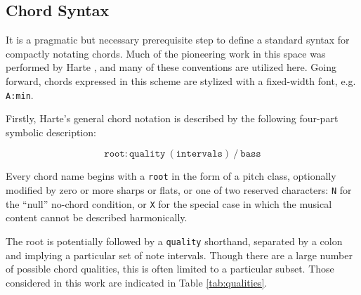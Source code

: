 \subsection{Chord Syntax}
\label{sec:chord_syntax}

It is a pragmatic but necessary prerequisite step to define a standard syntax for compactly notating chords.
Much of the pioneering work in this space was performed by Harte \cite{Harte2005Symbolic}, and many of these conventions are utilized here.
Going forward, chords expressed in this scheme are stylized with a fixed-width font, e.g. \texttt{A:min}.

Firstly, Harte's general chord notation is described by the following four-part symbolic description:

\begin{equation}
\texttt{root}:\texttt{quality}~(\texttt{intervals})~/~\texttt{bass}
\end{equation}

\noindent Every chord name begins with a \texttt{root} in the form of a pitch class, optionally modified by zero or more sharps or flats, or one of two reserved characters: \texttt{N} for the ``null'' no-chord condition, or \texttt{X} for the special case in which the musical content cannot be described harmonically.

The root is potentially followed by a \texttt{quality} shorthand, separated by a colon and implying a particular set of note intervals.
Though there are a large number of possible chord qualities, this is often limited to a particular subset.
Those considered in this work are indicated in Table \ref{tab:qualities}.

